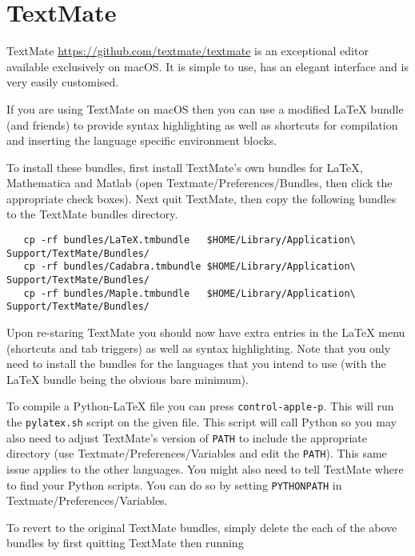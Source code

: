 \documentclass[12pt]{article}
\begin{document}
\thispagestyle{empty}

\section*{TextMate}

TextMate \href{https://github.com/textmate/textmate}{https://github.com/textmate/textmate} is an exceptional editor available exclusively on macOS. It is simple to use, has an elegant interface and is very easily customised.

If you are using TextMate on macOS then you can use a modified LaTeX bundle (and friends) to provide syntax highlighting as well as shortcuts for compilation and inserting the language specific environment blocks.

To install these bundles, first install TextMate's own bundles for LaTeX, Mathematica and Matlab (open Textmate/Preferences/Bundles, then click the appropriate check boxes). Next quit TextMate, then copy the following bundles to the TextMate bundles directory.

\begin{lstlisting}
   cp -rf bundles/LaTeX.tmbundle   $HOME/Library/Application\ Support/TextMate/Bundles/
   cp -rf bundles/Cadabra.tmbundle $HOME/Library/Application\ Support/TextMate/Bundles/
   cp -rf bundles/Maple.tmbundle   $HOME/Library/Application\ Support/TextMate/Bundles/
\end{lstlisting}

Upon re-staring TextMate you should now have extra entries in the LaTeX menu (shortcuts and tab triggers) as well as syntax highlighting. Note that you only need to install the bundles for the languages that you intend to use (with the LaTeX bundle being the obvious bare minimum).

To compile a Python-LaTeX file you can press {\tt\small control-apple-p}. This will run the {\tt\small pylatex.sh} script on the given file. This script will call Python so you may also need to adjust TextMate's version of {\tt\small PATH} to include the appropriate directory (use Textmate/Preferences/Variables and edit the {\tt\small PATH}). This same issue applies to the other languages. You might also need to tell TextMate where to find your  Python scripts. You can do so by setting {\tt\small PYTHONPATH} in Textmate/Preferences/Variables.

To revert to the original TextMate bundles, simply delete the each of the above bundles by first quitting TextMate then running
\end{document}
